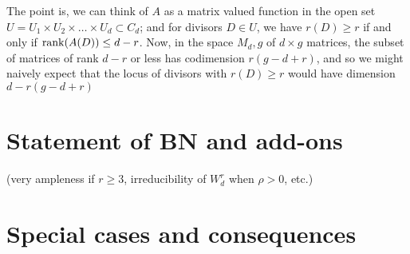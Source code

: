 \documentclass[12pt, leqno]{book}
\begin{document}
The point is, we can think of $A$ as a matrix valued function in the open set $U = U_1 \times U_2 \times \dots \times U_d \subset C_d$; and for divisors $D \in U$, we have $r(D) \geq r$ if and only if $\rank(A(D)) \leq d-r$. Now, in the space $M_d,g$ of $d \times g$ matrices, the subset of matrices of rank $d-r$ or less has codimension $r(g-d+r)$, and so we might naively expect that the locus of divisors with $r(D) \geq r$ would have dimension $d - r(g-d+r)$

\section{Statement of BN and add-ons}

 (very ampleness if $r \geq 3$, irreducibility of $W^r_d$ when $\rho > 0$, etc.)

\section{Special cases and consequences}
\end{document}
